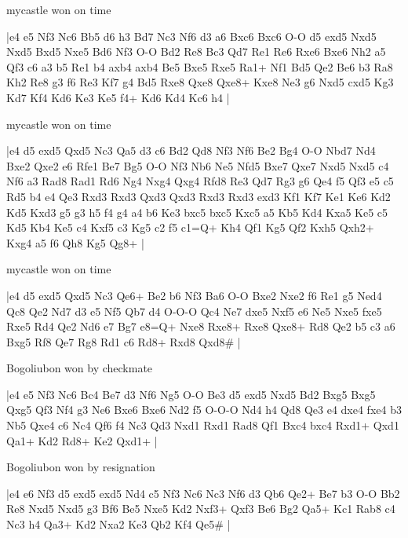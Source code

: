 \showboard

mycastle won on time

\makegametitle
|e4 e5 Nf3 Nc6 Bb5 d6 h3 Bd7 Nc3 Nf6 d3 a6 Bxc6 Bxc6 O-O d5 exd5 Nxd5 Nxd5 Bxd5 Nxe5 Bd6 Nf3 O-O Bd2 Re8 Bc3 Qd7 Re1 Re6 Rxe6 Bxe6 Nh2 a5 Qf3 c6 a3 b5 Re1 b4 axb4 axb4 Be5 Bxe5 Rxe5 Ra1+ Nf1 Bd5 Qe2 Be6 b3 Ra8 Kh2 Re8 g3 f6 Re3 Kf7 g4 Bd5 Rxe8 Qxe8 Qxe8+ Kxe8 Ne3 g6 Nxd5 cxd5 Kg3 Kd7 Kf4 Kd6 Ke3 Ke5 f4+ Kd6 Kd4 Kc6 h4  |

\showboard

mycastle won on time

\makegametitle
|e4 d5 exd5 Qxd5 Nc3 Qa5 d3 c6 Bd2 Qd8 Nf3 Nf6 Be2 Bg4 O-O Nbd7 Nd4 Bxe2 Qxe2 e6 Rfe1 Be7 Bg5 O-O Nf3 Nb6 Ne5 Nfd5 Bxe7 Qxe7 Nxd5 Nxd5 c4 Nf6 a3 Rad8 Rad1 Rd6 Ng4 Nxg4 Qxg4 Rfd8 Re3 Qd7 Rg3 g6 Qe4 f5 Qf3 e5 c5 Rd5 b4 e4 Qe3 Rxd3 Rxd3 Qxd3 Qxd3 Rxd3 Rxd3 exd3 Kf1 Kf7 Ke1 Ke6 Kd2 Kd5 Kxd3 g5 g3 h5 f4 g4 a4 b6 Ke3 bxc5 bxc5 Kxc5 a5 Kb5 Kd4 Kxa5 Ke5 c5 Kd5 Kb4 Ke5 c4 Kxf5 c3 Kg5 c2 f5 c1=Q+ Kh4 Qf1 Kg5 Qf2 Kxh5 Qxh2+ Kxg4 a5 f6 Qh8 Kg5 Qg8+  |

\showboard

mycastle won on time

\makegametitle
|e4 d5 exd5 Qxd5 Nc3 Qe6+ Be2 b6 Nf3 Ba6 O-O Bxe2 Nxe2 f6 Re1 g5 Ned4 Qc8 Qe2 Nd7 d3 e5 Nf5 Qb7 d4 O-O-O Qc4 Ne7 dxe5 Nxf5 e6 Ne5 Nxe5 fxe5 Rxe5 Rd4 Qe2 Nd6 e7 Bg7 e8=Q+ Nxe8 Rxe8+ Rxe8 Qxe8+ Rd8 Qe2 b5 c3 a6 Bxg5 Rf8 Qe7 Rg8 Rd1 c6 Rd8+ Rxd8 Qxd8\#  |

\showboard

Bogoliubon won by checkmate

\makegametitle
|e4 e5 Nf3 Nc6 Bc4 Be7 d3 Nf6 Ng5 O-O Be3 d5 exd5 Nxd5 Bd2 Bxg5 Bxg5 Qxg5 Qf3 Nf4 g3 Ne6 Bxe6 Bxe6 Nd2 f5 O-O-O Nd4 h4 Qd8 Qe3 e4 dxe4 fxe4 b3 Nb5 Qxe4 c6 Nc4 Qf6 f4 Nc3 Qd3 Nxd1 Rxd1 Rad8 Qf1 Bxc4 bxc4 Rxd1+ Qxd1 Qa1+ Kd2 Rd8+ Ke2 Qxd1+  |

\showboard

Bogoliubon won by resignation

\makegametitle
|e4 e6 Nf3 d5 exd5 exd5 Nd4 c5 Nf3 Nc6 Nc3 Nf6 d3 Qb6 Qe2+ Be7 b3 O-O Bb2 Re8 Nxd5 Nxd5 g3 Bf6 Be5 Nxe5 Kd2 Nxf3+ Qxf3 Be6 Bg2 Qa5+ Kc1 Rab8 c4 Nc3 h4 Qa3+ Kd2 Nxa2 Ke3 Qb2 Kf4 Qe5\#  |

